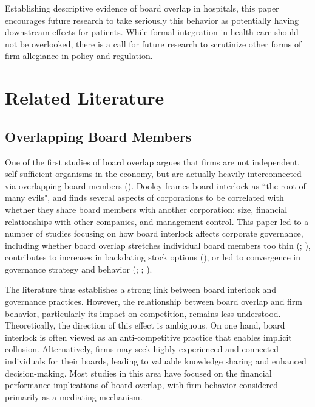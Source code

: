 \documentclass[12pt]{article}
\begin{document}
    Establishing descriptive evidence of board overlap in hospitals, this paper encourages future research to take seriously this behavior as potentially having downstream effects for patients. While formal integration in health care should not be overlooked, there is a call for future research to scrutinize other forms of firm allegiance in policy and regulation. 


    \section{Related Literature}


    \subsection{Overlapping Board Members}\label{sec:boardoverlaplit}

    One of the first studies of board overlap argues that firms are not independent, self-sufficient organisms in the economy, but are actually heavily interconnected via overlapping board members (\cite{dooley1969interlocking}). Dooley frames board interlock as ``the root of many evils", and finds several aspects of corporations to be correlated with whether they share board members with another corporation: size, financial relationships with other companies, and management control. This paper led to a number of studies focusing on how board interlock affects corporate governance, including whether board overlap stretches individual board members too thin (\cite{ferris2003too}; \cite{field2013busy}), contributes to increases in backdating stock options (\cite{bizjak2009option}), or led to convergence in governance strategy and behavior (\cite{bouwman2011corporate}; \cite{chiu2013board}; \cite{cai2014board}). 

    The literature thus establishes a strong link between board interlock and governance practices. However, the relationship between board overlap and firm behavior, particularly its impact on competition, remains less understood. Theoretically, the direction of this effect is ambiguous. On one hand, board interlock is often viewed as an anti-competitive practice that enables implicit collusion. Alternatively, firms may seek highly experienced and connected individuals for their boards, leading to valuable knowledge sharing and enhanced decision-making. Most studies in this area have focused on the financial performance implications of board overlap, with firm behavior considered primarily as a mediating mechanism.
\end{document}

